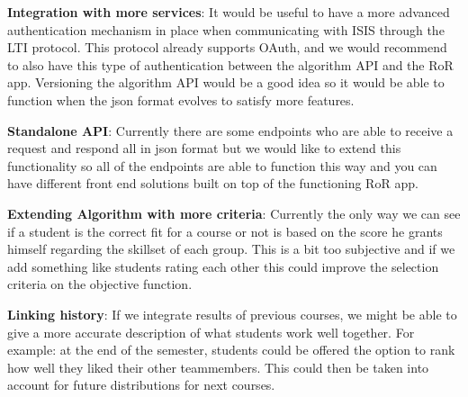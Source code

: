 \textbf{Integration with more services}: It would be useful to have a more advanced authentication mechanism in place when communicating with ISIS through the LTI protocol. This protocol already supports OAuth, and we would recommend to also have this type of authentication between the algorithm API and the RoR app. Versioning the algorithm API would be a good idea so it would be able to function when the json format evolves to satisfy more features.
 
\textbf{Standalone API}: Currently there are some endpoints who are able to receive a request and respond all in json format but we would like to extend this functionality so all of the endpoints are able to function this way and you can have different front end solutions built on top of the functioning RoR app.

\textbf{Extending Algorithm with more criteria}: Currently the only way we can see if a student is the correct fit for a course or not is based on the score he grants himself regarding the skillset of each group. This is a bit too subjective and if we add something like students rating each other this could improve the selection criteria on the objective function.

\textbf{Linking history}: If we integrate results of previous courses, we might be able to give a more accurate description of what students work well together. For example: at the end of the semester, students could be offered the option to rank how well they liked their other teammembers. This could then be taken into account for future distributions for next courses.